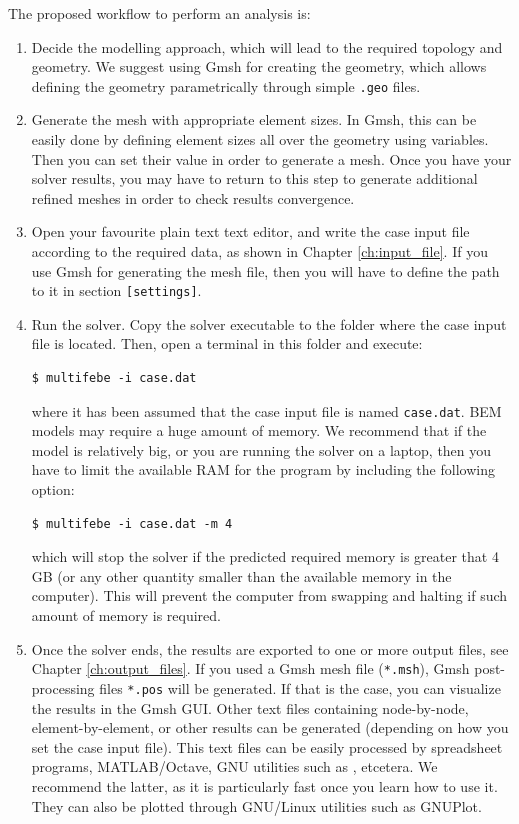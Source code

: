\documentclass[a4paper,fleqn]{book}
\begin{document}
The proposed workflow to perform an analysis is:
\begin{enumerate}
    \item Decide the modelling approach, which will lead to the required topology and geometry. We suggest using Gmsh for creating the geometry, which allows defining the geometry parametrically through simple \texttt{.geo} files.
    \item Generate the mesh with appropriate element sizes. In Gmsh, this can be easily done by defining element sizes all over the geometry using variables. Then you can set their value in order to generate a mesh. Once you have your solver results, you may have to return to this step to generate additional refined meshes in order to check results convergence.
    \item Open your favourite plain text text editor, and write the case input file according to the required data, as shown in Chapter \ref{ch:input_file}. If you use Gmsh for generating the mesh file, then you will have to define the path to it in section \texttt{[settings]}.
    \item Run the solver. Copy the solver executable to the folder where the case input file is located. Then, open a terminal in this folder and execute:
\begin{Verbatim}[frame=single, fontsize=\small]
$ multifebe -i case.dat
\end{Verbatim}
    where it has been assumed that the case input file is named \texttt{case.dat}. BEM models may require a huge amount of memory. We recommend that if the model is relatively big, or you are running the solver on a laptop, then you have to limit the available RAM for the program by including the following option:
\begin{Verbatim}[frame=single, fontsize=\small]
$ multifebe -i case.dat -m 4
\end{Verbatim}
    which will stop the solver if the predicted required memory is greater that 4 GB (or any other quantity smaller than the available memory in the computer). This will prevent the computer from swapping and halting if such amount of memory is required.
    \item Once the solver ends, the results are exported to one or more output files, see Chapter \ref{ch:output_files}. If you used a Gmsh mesh file (\texttt{*.msh}), Gmsh post-processing files \texttt{*.pos} will be generated. If that is the case, you can visualize the results in the Gmsh GUI. Other text files containing node-by-node, element-by-element, or other results can be generated (depending on how you set the case input file). This text files can be easily processed by spreadsheet programs, MATLAB/Octave, GNU utilities such as , etcetera. We recommend the latter, as it is particularly fast once you learn how to use it. They can also be plotted through GNU/Linux utilities such as GNUPlot.
\end{enumerate}
\end{document}
